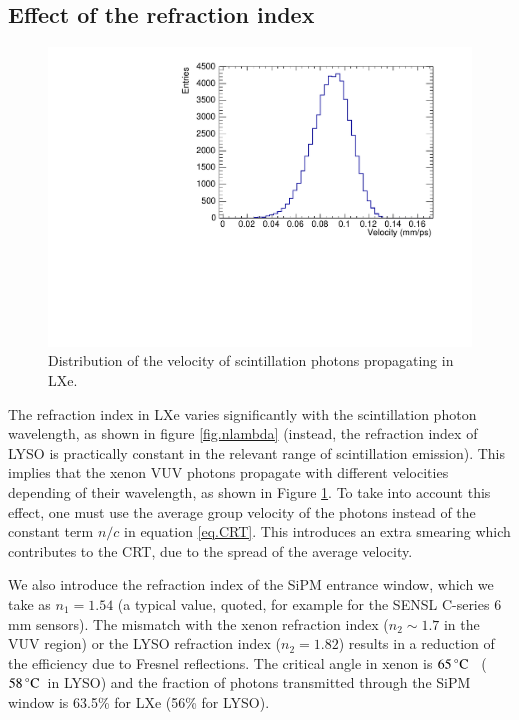 \documentclass[review]{elsarticle}
\begin{document}
\subsection*{Effect of the refraction index}
\begin{figure}[!bhtp]
	\centering
	\includegraphics[scale=0.4]{../img/VelocityDistrLXe.pdf}
	\caption{\label{fig.vLXe} Distribution of the velocity of scintillation photons propagating in LXe.}
\end{figure}

The refraction index in LXe varies significantly with the scintillation photon wavelength, as shown in figure  \ref{fig.nlambda} (instead, the refraction index of LYSO is practically constant in the relevant range of scintillation
emission). This implies that the xenon VUV photons propagate with different velocities depending of their wavelength, as shown in Figure \ref{fig.vLXe}. To take into account this effect, one must use the average group velocity of the photons instead of the constant term $n/c$
in equation \ref{eq.CRT}. This introduces an extra smearing which contributes to the CRT, due to the spread of the average velocity. 

We also introduce the refraction index of the SiPM entrance window, which we take as $n_1 = 1.54$ (a typical value, quoted, for example for the SENSL C-series 6 mm sensors). The mismatch with the xenon refraction index
($n_2 \sim 1.7$ in the VUV region) or the LYSO refraction index ($n_2 = 1.82$) results in a reduction of the efficiency due to Fresnel reflections. The critical angle in xenon is $65\,^{\circ}{\rm C}$ ~($58\,^{\circ}{\rm C}$~in LYSO) and the fraction of photons transmitted through the SiPM window is 63.5\% for LXe (56\% for LYSO).  
\end{document}
